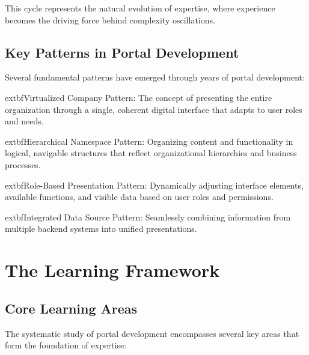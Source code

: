 This cycle represents the natural evolution of expertise, where experience becomes the driving force behind complexity oscillations.

\subsection{Key Patterns in Portal Development}

Several fundamental patterns have emerged through years of portal development:

	extbf{Virtualized Company Pattern:} The concept of presenting the entire organization through a single, coherent digital interface that adapts to user roles and needs.

	extbf{Hierarchical Namespace Pattern:} Organizing content and functionality in logical, navigable structures that reflect organizational hierarchies and business processes.

	extbf{Role-Based Presentation Pattern:} Dynamically adjusting interface elements, available functions, and visible data based on user roles and permissions.

	extbf{Integrated Data Source Pattern:} Seamlessly combining information from multiple backend systems into unified presentations.

\section{The Learning Framework}

\subsection{Core Learning Areas}

The systematic study of portal development encompasses several key areas that form the foundation of expertise:

